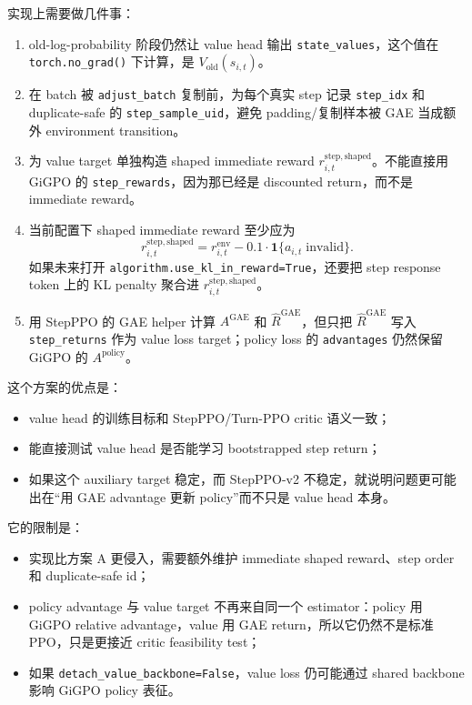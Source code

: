 \documentclass[10pt]{ctexart}
\newcommand{\code}[1]{\texttt{#1}}
\begin{document}
实现上需要做几件事：
\begin{enumerate}
  \item old-log-probability 阶段仍然让 value head 输出 \code{state\_values}，这个值在 \code{torch.no\_grad()} 下计算，是 \(V_{\mathrm{old}}(s_{i,t})\)。
  \item 在 batch 被 \code{adjust\_batch} 复制前，为每个真实 step 记录 \code{step\_idx} 和 duplicate-safe 的 \code{step\_sample\_uid}，避免 padding/复制样本被 GAE 当成额外 environment transition。
  \item 为 value target 单独构造 shaped immediate reward \(r_{i,t}^{\mathrm{step,shaped}}\)。不能直接用 GiGPO 的 \code{step\_rewards}，因为那已经是 discounted return，而不是 immediate reward。
  \item 当前配置下 shaped immediate reward 至少应为
  \[
  r_{i,t}^{\mathrm{step,shaped}}
  =r_{i,t}^{\mathrm{env}}-0.1\cdot\mathbf{1}\{a_{i,t}\;\text{invalid}\}.
  \]
  如果未来打开 \code{algorithm.use\_kl\_in\_reward=True}，还要把 step response token 上的 KL penalty 聚合进 \(r_{i,t}^{\mathrm{step,shaped}}\)。
  \item 用 StepPPO 的 GAE helper 计算 \(A^{\mathrm{GAE}}\) 和 \(\hat R^{\mathrm{GAE}}\)，但只把 \(\hat R^{\mathrm{GAE}}\) 写入 \code{step\_returns} 作为 value loss target；policy loss 的 \code{advantages} 仍然保留 GiGPO 的 \(A^{\mathrm{policy}}\)。
\end{enumerate}

这个方案的优点是：
\begin{itemize}
  \item value head 的训练目标和 StepPPO/Turn-PPO critic 语义一致；
  \item 能直接测试 value head 是否能学习 bootstrapped step return；
  \item 如果这个 auxiliary target 稳定，而 StepPPO-v2 不稳定，就说明问题更可能出在“用 GAE advantage 更新 policy”而不只是 value head 本身。
\end{itemize}

它的限制是：
\begin{itemize}
  \item 实现比方案 A 更侵入，需要额外维护 immediate shaped reward、step order 和 duplicate-safe id；
  \item policy advantage 与 value target 不再来自同一个 estimator：policy 用 GiGPO relative advantage，value 用 GAE return，所以它仍然不是标准 PPO，只是更接近 critic feasibility test；
  \item 如果 \code{detach\_value\_backbone=False}，value loss 仍可能通过 shared backbone 影响 GiGPO policy 表征。
\end{itemize}
\end{document}
